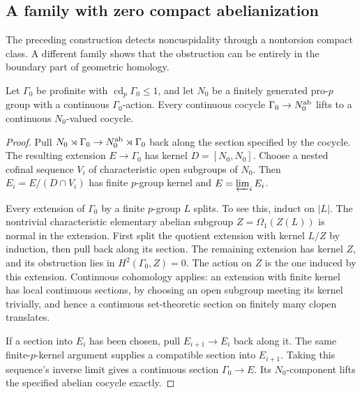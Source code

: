 \subsection{A family with zero compact abelianization}

The preceding construction detects noncuspidality through a nontorsion
compact class. A different family shows that the obstruction can be
entirely in the boundary part of geometric homology.

\begin{lemma}
\label{lem:cdlift}
Let $\Gamma_0$ be profinite with $\operatorname{cd}_p\Gamma_0\leq1$,
and let $N_0$ be a finitely generated pro-$p$ group with a continuous
$\Gamma_0$-action. Every continuous cocycle
$\Gamma_0\to N_0^{\mathrm{ab}}$ lifts to a continuous $N_0$-valued cocycle.
\end{lemma}
\begin{proof}
Pull $N_0\rtimes\Gamma_0\to N_0^{\mathrm{ab}}\rtimes\Gamma_0$ back along
the section specified by the cocycle. The resulting extension
$E\to\Gamma_0$ has kernel $D=[N_0,N_0]$.
Choose a nested cofinal sequence $V_i$ of characteristic open subgroups
of $N_0$. Then $E_i=E/(D\cap V_i)$ has finite $p$-group kernel and
$E=\varprojlim_iE_i$.

Every extension of $\Gamma_0$ by a finite $p$-group $L$ splits.
To see this, induct on $|L|$. The nontrivial characteristic elementary
abelian subgroup $Z=\Omega_1(Z(L))$ is normal in the extension.
First split the quotient extension with kernel $L/Z$ by induction,
then pull back along its section. The remaining extension has kernel
$Z$, and its obstruction lies in $H^2(\Gamma_0,Z)=0$.
The action on $Z$ is the one induced by this extension. Continuous
cohomology applies: an extension with finite kernel has local
continuous sections, by choosing an open subgroup meeting its kernel
trivially, and hence a continuous set-theoretic section on finitely
many clopen translates.

If a section into $E_i$ has been chosen, pull $E_{i+1}\to E_i$ back
along it. The same finite-$p$-kernel argument supplies a compatible
section into $E_{i+1}$. Taking this sequence's inverse limit gives a
continuous section $\Gamma_0\to E$. Its $N_0$-component lifts the
specified abelian cocycle exactly.
\end{proof}

